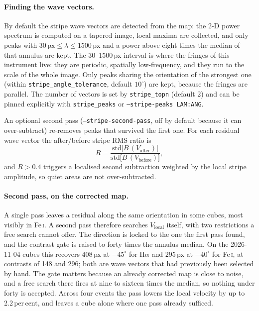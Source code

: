 \documentclass[11pt,a4paper]{article}
\newcommand{\code}[1]{\texttt{\small #1}}
\begin{document}
\paragraph{Finding the wave vectors.}  By default the stripe wave vectors are
detected from the map: the 2-D power spectrum is computed on a tapered image,
local maxima are collected, and only peaks with
$30\,\mathrm{px} \le \lambda \le 1500\,\mathrm{px}$ and a power above eight times
the median of that annulus are kept.  The 30--1500\,px interval is where the
fringes of this instrument live: they are periodic, spatially low-frequency, and
they run to the scale of the whole image.  Only peaks sharing the orientation of
  the strongest one (within \code{stripe\_angle\_tolerance}, default
  $10^\circ$) are kept, because the fringes are parallel.  The number of vectors is set by
\code{stripe\_topn} (default 2) and can be pinned explicitly with
\code{stripe\_peaks} or \code{--stripe-peaks LAM:ANG}.

An optional second pass (\code{--stripe-second-pass}, off by default because it
can over-subtract) re-removes peaks that survived the first one.  For each
residual wave vector the after/before stripe RMS ratio is
\begin{equation}
  R = \frac{\mathrm{std}\big[B\,(V_{\mathrm{after}})\big]}
           {\mathrm{std}\big[B\,(V_{\mathrm{before}})\big]},
\end{equation}
and $R > 0.4$ triggers a localised second subtraction weighted by the local
stripe amplitude, so quiet areas are not over-subtracted.

\paragraph{Second pass, on the corrected map.}  A single pass leaves a residual
along the same orientation in some cubes, most visibly in Fe\,\textsc{i}.  A
second pass therefore searches $V_{\mathrm{local}}$ itself, with two restrictions
a free search cannot offer.  The direction is locked to the one the first pass
found, and the contrast gate is raised to forty times the annulus median.  On the
2026-11-04 cubes this recovers 408\,px at $-45^\circ$ for H$\alpha$ and
295\,px at $-40^\circ$ for Fe\,\textsc{i}, at contrasts of 148 and 296; both are
wave vectors that had previously been selected by hand.  The gate matters because
an already corrected map is close to noise, and a free search there fires at nine
to sixteen times the median, so nothing under forty is accepted.  Across four
events the pass lowers the local velocity by up to 2.2\,per\,cent, and leaves a
cube alone where one pass already sufficed.
\end{document}

